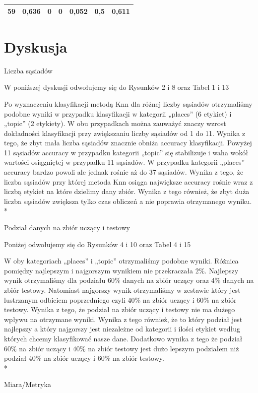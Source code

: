 \documentclass{classrep}
\begin{document}
{\begin{table}[H]
\begin{center}
\begin{tabular}{|l|l|l|l|l|l|l|}
59                                                        & 0,636                                               & 0                                                      & 0                                                       & 0,052                                                      & 0,5                                                    & 0,611                                                     \\ \hline
\end{tabular}
\end{center}
\end{table}
}

\section{Dyskusja}
{

Liczba sąsiadów

W poniższej dyskusji odwołujemy się do Rysunków 2 i 8 oraz Tabel 1 i 13

Po wyznaczeniu klasyfikacji metodą Knn dla różnej liczby sąsiadów otrzymaliśmy podobne wyniki w przypadku klasyfikacji w kategorii „places” (6 etykiet) i „topic” (2 etykiety). W obu przypadkach można zauważyć znaczy wzrost dokładności klasyfikacji przy zwiększaniu liczby sąsiadów od 1 do 11. Wynika z tego, że zbyt mała liczba sąsiadów znacznie obniża accuracy klasyfikacji. Powyżej 11 sąsiadów accuracy w przypadku kategorii „topic” się stabilizuje i waha wokół wartości osiągniętej w przypadku 11 sąsiadów.  W przypadku kategorii „places” accuracy bardzo powoli ale jednak rośnie aż do 37 sąsiadów. Wynika z tego, że liczba sąsiadów przy której metoda Knn osiąga największe accuracy rośnie wraz z liczbą etykiet na które dzielimy dany zbiór. Wynika z tego również, że zbyt duża liczba sąsiadów zwiększa tylko czas obliczeń a nie poprawia otrzymanego wyniku.
\\*
\par Podział danych na zbiór uczący i testowy

Poniżej odwołujemy się do Rysunków 4 i 10 oraz Tabel 4 i 15

W oby kategoriach „places” i „topic” otrzymaliśmy podobne wyniki. Różnica pomiędzy najlepszym i najgorszym wynikiem nie przekraczała 2\%. Najlepszy wynik otrzymaliśmy dla podziału 60\% danych na zbiór uczący oraz 4\% danych na zbiór testowy. Natomiast najgorszy wynik otrzymaliśmy w zestawie który jest lustrzanym odbiciem poprzedniego czyli 40\% na zbiór uczący i 60\% na zbiór testowy. Wynika z tego, że podział na zbiór uczący i testowy nie ma dużego wpływu na otrzymane wyniki. Wynika z tego również, że to który podział jest najlepszy a który najgorszy jest niezależne od kategorii i ilości etykiet według których chcemy klasyfikować nasze dane. Dodatkowo wynika z tego że podział 60\% na zbiór uczący i 40\% na zbiór testowy jest dużo lepszym podziałem niż podział 40\% na zbiór uczący i 60\% na zbiór testowy.
\\*
\par Miara/Metryka

}
\end{document}
